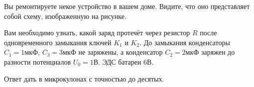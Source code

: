 
Вы ремонтируете некое устройство в вашем доме. Видите, что оно представляет собой схему, изображенную на рисунке.


Вам необходимо узнать, какой заряд протечёт через резистор $ R $ после одновременного замыкания ключей 
$ K_1 $ и $ K_2 $. До замыкания конденсаторы $ C_1 = 1\text{мкФ}$, $ C_3 = 3\text{мкФ}$ не заряжены, 
а конденсатор $ C_2 = 2\text{мкФ}$ заряжен до разности потенциалов $ U_0 = 1\text{В}$. ЭДС батареи $ 6\text{В} $. 

Ответ дать в микрокулонах с точностью до десятых.


